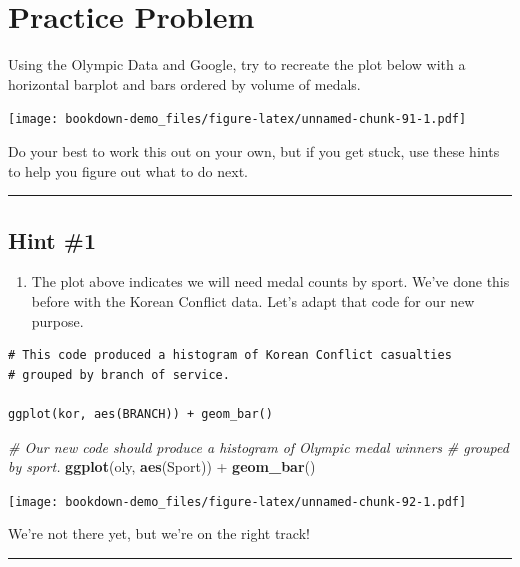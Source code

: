 \documentclass[]{book}
\newenvironment{Shaded}{\begin{snugshade}}{\end{snugshade}}
\newcommand{\KeywordTok}[1]{\textcolor[rgb]{0.13,0.29,0.53}{\textbf{{#1}}}}
\newcommand{\StringTok}[1]{\textcolor[rgb]{0.31,0.60,0.02}{{#1}}}
\newcommand{\CommentTok}[1]{\textcolor[rgb]{0.56,0.35,0.01}{\textit{{#1}}}}
\newcommand{\NormalTok}[1]{{#1}}
\providecommand{\tightlist}{%
  \setlength{\itemsep}{0pt}\setlength{\parskip}{0pt}}
\begin{document}
\section{Practice Problem}\label{practice-problem-2}

Using the Olympic Data and Google, try to recreate the plot below with a
horizontal barplot and bars ordered by volume of medals.

\texttt{[image: bookdown-demo\_files/figure-latex/unnamed-chunk-91-1.pdf]}

Do your best to work this out on your own, but if you get stuck, use
these hints to help you figure out what to do next.

\begin{center}\rule{0.5\linewidth}{\linethickness}\end{center}

\subsection{Hint \#1}\label{hint-1}

\begin{enumerate}
\def\labelenumi{\arabic{enumi})}
\tightlist
\item
  The plot above indicates we will need medal counts by sport. We've
  done this before with the Korean Conflict data. Let's adapt that code
  for our new purpose.
\end{enumerate}

\begin{verbatim}
# This code produced a histogram of Korean Conflict casualties 
# grouped by branch of service.

ggplot(kor, aes(BRANCH)) + geom_bar()
\end{verbatim}

\begin{Shaded}
\begin{Highlighting}[]
\CommentTok{# Our new code should produce a histogram of Olympic medal winners }
\CommentTok{# grouped by sport.}
\KeywordTok{ggplot}\NormalTok{(oly, }\KeywordTok{aes}\NormalTok{(Sport)) +}\StringTok{ }\KeywordTok{geom_bar}\NormalTok{()}
\end{Highlighting}
\end{Shaded}

\texttt{[image: bookdown-demo\_files/figure-latex/unnamed-chunk-92-1.pdf]}

We're not there yet, but we're on the right track!

\begin{center}\rule{0.5\linewidth}{\linethickness}\end{center}
\end{document}
